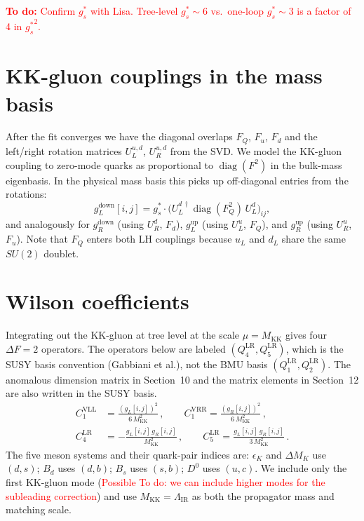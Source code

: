 \documentclass[11pt]{article}
\newcommand{\Mkk}{M_{\mathrm{KK}}}
\newcommand{\LamIR}{\Lambda_{\mathrm{IR}}}
\newcommand{\gs}{g_s^*}
\begin{document}
\textcolor{red}{\textbf{To do:} Confirm $\gs$ with Lisa. Tree-level
$\gs \sim 6$ vs.\ one-loop $\gs \sim 3$ is a factor of 4 in ${\gs}^2$.}


\section{KK-gluon couplings in the mass basis}

After the fit converges we have the diagonal overlaps $F_Q$, $F_u$, $F_d$ and
the left/right rotation matrices $U_L^{u,d}$, $U_R^{u,d}$ from the SVD. We
model the KK-gluon coupling to zero-mode quarks as proportional to
$\operatorname{diag}(F^2)$ in the bulk-mass eigenbasis.
In the physical mass basis this picks up off-diagonal entries from the
rotations:
\begin{equation}
  g_{L}^{\mathrm{down}}[i,j] = \gs \cdot
    \bigl(U_L^{d\,\dagger} \operatorname{diag}(F_Q^2)\, U_L^d\bigr)_{ij},
\end{equation}
and analogously for $g_R^{\mathrm{down}}$ (using $U_R^d$, $F_d$),
$g_L^{\mathrm{up}}$ (using $U_L^u$, $F_Q$), and $g_R^{\mathrm{up}}$ (using
$U_R^u$, $F_u$). Note that $F_Q$ enters both LH couplings because $u_L$ and
$d_L$ share the same $SU(2)$ doublet.


\section{Wilson coefficients}

Integrating out the KK-gluon at tree level at the scale $\mu = \Mkk$ gives
four $\Delta F = 2$ operators. The operators below are labeled
$(Q_4^{\mathrm{LR}}, Q_5^{\mathrm{LR}})$, which is the SUSY basis
convention (Gabbiani et al.), not the BMU basis $(Q_1^{\mathrm{LR}},
Q_2^{\mathrm{LR}})$. The anomalous dimension matrix in
Section~10 and the matrix elements in Section~12 are also written in
the SUSY basis. 
\begin{align}
  C_1^{\mathrm{VLL}} &= \frac{(g_L[i,j])^2}{6\,\Mkk^2}\,, \qquad
  C_1^{\mathrm{VRR}} = \frac{(g_R[i,j])^2}{6\,\Mkk^2}\,, \\[4pt]
  C_4^{\mathrm{LR}} &= -\frac{g_L[i,j]\,g_R[i,j]}{\Mkk^2}\,, \qquad
  C_5^{\mathrm{LR}} = \frac{g_L[i,j]\,g_R[i,j]}{3\,\Mkk^2}\,.
\end{align}
The five meson systems and their quark-pair indices are: $\epsilon_K$ and
$\Delta M_K$ use $(d,s)$; $B_d$ uses $(d,b)$; $B_s$ uses $(s,b)$; $D^0$
uses $(u,c)$. We include only the first KK-gluon mode (\textcolor{red}{Possible To do: we can include higher modes for the subleading correction}) and use $\Mkk = \LamIR$ as both the
propagator mass and matching scale.
\end{document}
